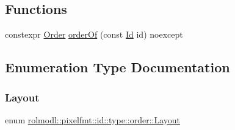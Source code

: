 \subsection*{Functions}
\begin{DoxyCompactItemize}
\item 
constexpr \mbox{\hyperlink{namespacerolmodl_1_1pixelfmt_1_1id_1_1type_a01a03db37a556bc98643bd88b2f5b6b3}{Order}} \mbox{\hyperlink{namespacerolmodl_1_1pixelfmt_1_1id_1_1type_1_1order_a509dae39ae8be612b6829f6a3bdf355a}{order\+Of}} (const \mbox{\hyperlink{namespacerolmodl_1_1pixelfmt_a96282713e4465ba9211c8fd3a702b52b}{Id}} id) noexcept
\end{DoxyCompactItemize}


\subsection{Enumeration Type Documentation}
\mbox{\label{namespacerolmodl_1_1pixelfmt_1_1id_1_1type_1_1order_a4177275b82f1923d1a2f07e1f87f0391}} 
\subsubsection{\texorpdfstring{Layout}{Layout}}
{\footnotesize\ttfamily enum \mbox{\hyperlink{namespacerolmodl_1_1pixelfmt_1_1id_1_1type_1_1order_a4177275b82f1923d1a2f07e1f87f0391}{rolmodl\+::pixelfmt\+::id\+::type\+::order\+::\+Layout}}\hspace{0.3cm}{\ttfamily [strong]}}

